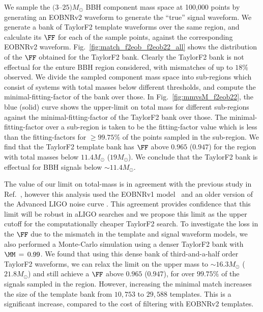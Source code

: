 We sample the $(3$--$25) M_\odot$ BBH component mass space at 100,000 points by
generating an EOBNRv2 waveform to generate the ``true'' signal waveform.  We
generate a bank of TaylorF2 template waveforms over the same region, and
calculate its $\FF$ for each of the sample points, against the corresponding
EOBNRv2 waveform. Fig.~\ref{fig:match_f2eob_f2eob22_all}  shows the
distribution of the $\FF$ obtained for the TaylorF2 bank. Clearly the TaylorF2
bank is not effectual for the enture BBH region considered, with mismatches of
up to $18\%$ observed. We divide the sampled component mass space into
sub-regions which consist of systems with total masses below different thresholds,
and compute the minimal-fitting-factor of the bank over those. In Fig.~\ref{fig:mmvsM_f2eob22}, 
the blue (solid) curve shows the upper-limit on 
total mass for different sub-regions against the minimal-fitting-factor of the 
TaylorF2 bank over those. The minimal-fitting-factor over a sub-region is 
taken to be the fitting-factor value which is less than the fitting-factors
for $\geq 99.75\%$ of the points sampled in the sub-region. We find that the 
TaylorF2 template bank has $\FF$ above $0.965$ ($0.947$) for the region 
with total masses below $11.4M_{\odot}$ ($19M_{\odot}$). We conclude 
that the TaylorF2 bank is effectual for BBH signals below $\sim 11.4M_{\odot}$. 

The value of our limit on total-mass is in agreement with the previous study in
Ref.~\citep{CompTemplates2009}, however this analysis used the EOBNRv1
model~\citep{Buonanno:2007pf} and an older version of the Advanced LIGO noise
curve \citep{CompTemplates2009}. This agreement provides
confidence that this limit will be robust in aLIGO searches and we propose
this limit as the upper cutoff for the computationally cheaper TaylorF2
search. To investigate the loss in the $\FF$ due to the mismatch in the
template and signal waveform models, we also performed a Monte-Carlo
simulation using a denser TaylorF2 bank with $\MM\,=\,0.99$. We found that
using this dense bank of third-and-a-half order TaylorF2 waveforms, we can
relax the limit on the upper mass to $\sim 16.3M_{\odot}$ ($21.8M_{\odot}$) and
still achieve a  $\FF$ above $0.965$ ($0.947$), for over $99.75\%$ of the signals
sampled in the region.  However, 
increasing the minimal match increases the size of the template bank from 
$10,753$ to $29,588$ templates. This is a significant increase, compared to 
the cost of filtering with EOBNRv2 templates.

